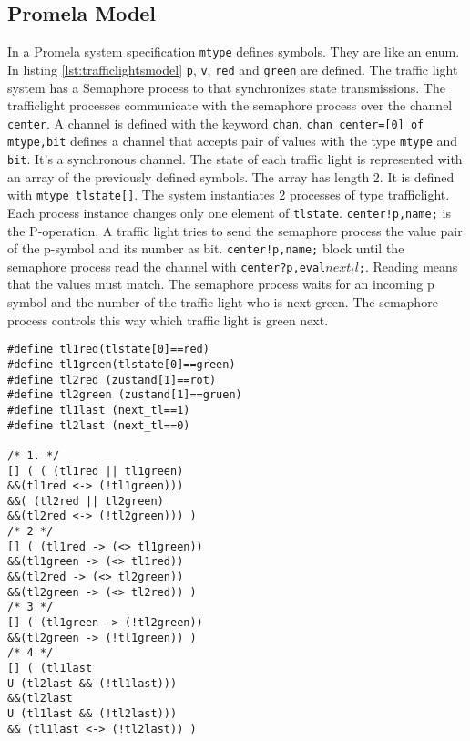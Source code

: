 \documentclass[a4paper, twoside]{article}
\begin{document}
\subsection{Promela Model}
\label{sec:trafficlightsmodel}



In a Promela system specification \texttt{mtype} defines symbols. They are like an enum. In listing \ref{lst:trafficlightsmodel} \texttt{p}, \texttt{v}, \texttt{red} and \texttt{green} are defined. The traffic light system has a Semaphore process to that synchronizes state transmissions.  The trafficlight processes communicate with the semaphore process over the channel \texttt{center}. A channel is defined with the keyword \texttt{chan}. \texttt{chan center=[0] of {mtype,bit}} defines a channel that accepts pair of values with the type \texttt{mtype} and \texttt{bit}. It's a synchronous channel. The state of each traffic light is represented with an array of the previously defined symbols. The array has length 2. It is defined with \texttt{mtype tlstate[]}. The system instantiates 2 processes of type trafficlight. Each process instance changes only one element of \texttt{tlstate}. \texttt{center!p,name;} is the P-operation. A traffic light tries to send the semaphore process the value pair of the p-symbol and its number as bit. \texttt{center!p,name;} block until the semaphore process read the channel with \texttt{center?p,eval\(next_tl\);}. Reading means that the values must match. The semaphore process waits for an incoming p symbol and the number of the traffic light who is next green. The semaphore process controls this way which traffic light is green next.

\begin{lstlisting}[label={lst:spinltl},caption={LTL-properties with formalized atomic propositions for spin}]
#define tl1red(tlstate[0]==red)
#define tl1green(tlstate[0]==green)
#define tl2red (zustand[1]==rot)
#define tl2green (zustand[1]==gruen)
#define tl1last (next_tl==1)
#define tl2last (next_tl==0)

/* 1. */
[] ( ( (tl1red || tl1green)
&&(tl1red <-> (!tl1green)))
&&( (tl2red || tl2green)
&&(tl2red <-> (!tl2green))) )
/* 2 */
[] ( (tl1red -> (<> tl1green))
&&(tl1green -> (<> tl1red))
&&(tl2red -> (<> tl2green))
&&(tl2green -> (<> tl2red)) )
/* 3 */
[] ( (tl1green -> (!tl2green))
&&(tl2green -> (!tl1green)) )
/* 4 */
[] ( (tl1last
U (tl2last && (!tl1last)))
&&(tl2last
U (tl1last && (!tl2last)))
&& (tl1last <-> (!tl2last)) )
\end{lstlisting}
\end{document}
